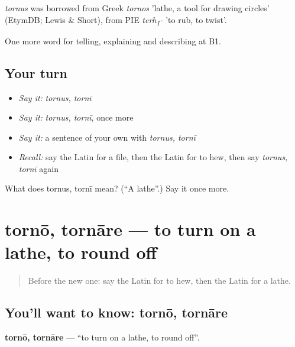 \begin{cousinweb}
\emph{tornus} was borrowed from Greek \emph{tornos} 'lathe, a tool for drawing circles' (EtymDB; Lewis \& Short), from PIE \emph{terh\textsubscript{1}-} 'to rub, to twist'.
\end{cousinweb}

\begin{grammarlens}[title={What you've built}]
One more word for telling, explaining and describing at B1.
\end{grammarlens}

\subsection*{Your turn}
\begin{itemize}
\raggedright
  \item \emph{Say it:} \emph{tornus, tornī}
  \item \emph{Say it:} \emph{tornus, tornī}, once more
  \item \emph{Say it:} a sentence of your own with \emph{tornus, tornī}
  \item \emph{Recall:} say the Latin for a file, then the Latin for to hew, then say \emph{tornus, tornī} again
\end{itemize}

\begin{tcolorbox}[breakable,colback=teal!4,colframe=teal!35!black,title={Before you move on}]
What does tornus, tornī mean? (\textquotedblleft{}A lathe\textquotedblright{}.) Say it once more.
\end{tcolorbox}
\section[tornō, tornāre]{tornō, tornāre — to turn on a lathe, to round off}

\label{lesson:LA-C471-torno}



\begin{quote}
Before the new one: say the Latin for to hew, then the Latin for a lathe.
\end{quote}

\subsection*{You'll want to know: tornō, tornāre}
\textbf{tornō, tornāre} — \textquotedblleft{}to turn on a lathe, to round off\textquotedblright{}.

